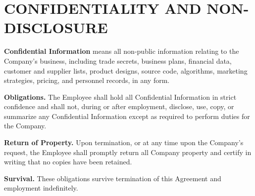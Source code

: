 \section{CONFIDENTIALITY AND NON-DISCLOSURE}

\parsp
\textbf{Confidential Information} means all non-public information relating to the Company's business, including trade secrets, business plans, financial data, customer and supplier lists, product designs, source code, algorithms, marketing strategies, pricing, and personnel records, in any form.

\parsp
\textbf{Obligations.} The Employee shall hold all Confidential Information in strict confidence and shall not, during or after employment, disclose, use, copy, or summarize any Confidential Information except as required to perform duties for the Company.

\parsp
\textbf{Return of Property.} Upon termination, or at any time upon the Company's request, the Employee shall promptly return all Company property and certify in writing that no copies have been retained.

\parsp
\textbf{Survival.} These obligations survive termination of this Agreement and employment indefinitely.

